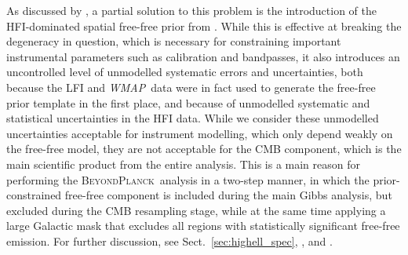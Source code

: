 \documentclass[twocolumn]{aa}
\def\WMAP{\textit{WMAP}}
\newcommand{\BP}{\textsc{BeyondPlanck}}
\begin{document}
As discussed by \citet{bp13}, a partial solution to this problem is
the introduction of the HFI-dominated spatial free-free prior from
\citet{planck2014-a12}. While this is effective at breaking the
degeneracy in question, which is necessary for constraining important
instrumental parameters such as calibration and bandpasses, it also
introduces an uncontrolled level of unmodelled systematic errors and
uncertainties, both because the LFI and \WMAP\ data were in fact used
to generate the free-free prior template in the first place, and
because of unmodelled systematic and statistical uncertainties in the
HFI data. While we consider these unmodelled uncertainties acceptable
for instrument modelling, which only depend weakly on the free-free
model, they are not acceptable for the CMB component, which is the
main scientific product from the entire analysis. This is a main
reason for performing the \BP\ analysis in a two-step manner, in which
the prior-constrained free-free component is included during the main
Gibbs analysis, but excluded during the CMB resampling stage, while at
the same time applying a large Galactic mask that excludes all regions
with statistically significant free-free emission. For further
discussion, see Sect.~\ref{sec:highell_spec}, \citet{bp12}, and
\citet{bp13}. 
\end{document}
